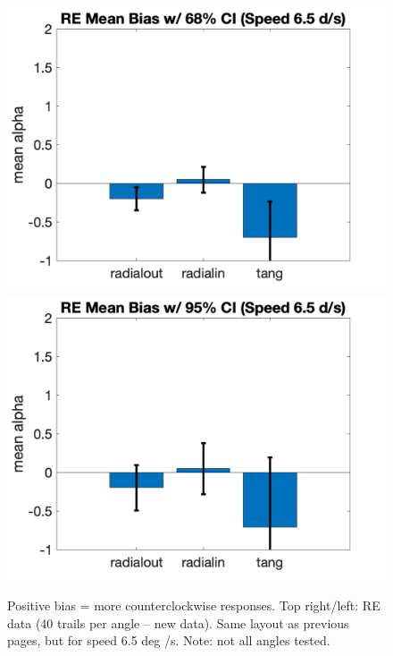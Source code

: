\documentclass[11pt]{article} %
\begin{document}
\begin{figure}[H]
\includegraphics[scale=.2]{Images/MeanBiasError_68ci_RE_speed6.5.png}
\includegraphics[scale=.2]{Images/MeanBiasError_95ci_RE_speed6.5.png}
\caption{Positive bias = more counterclockwise responses. Top right/left: RE data (40 trails per angle -- new data).  Same layout as previous pages, but for speed 6.5 deg /s. Note: not all angles tested.}
\end{figure}

\newpage
\end{document}
